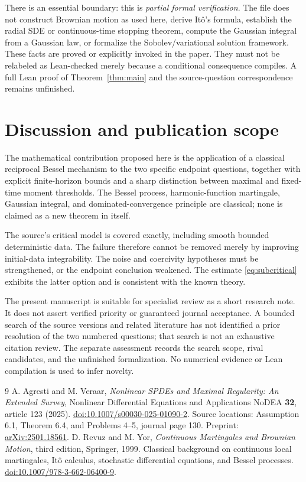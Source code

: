 \documentclass[11pt]{article}
\theoremstyle{remark}\newtheorem{remark}[theorem]{Remark}
\begin{document}
There is an essential boundary: this is \emph{partial formal verification}. The file does not construct Brownian motion as used here, derive It\^o's formula, establish the radial SDE or continuous-time stopping theorem, compute the Gaussian integral from a Gaussian law, or formalize the Sobolev/variational solution framework. These facts are proved or explicitly invoked in the paper. They must not be relabeled as Lean-checked merely because a conditional consequence compiles. A full Lean proof of Theorem~\ref{thm:main} and the source-question correspondence remains unfinished.

\section{Discussion and publication scope}
The mathematical contribution proposed here is the application of a classical reciprocal Bessel mechanism to the two specific endpoint questions, together with explicit finite-horizon bounds and a sharp distinction between maximal and fixed-time moment thresholds. The Bessel process, harmonic-function martingale, Gaussian integral, and dominated-convergence principle are classical; none is claimed as a new theorem in itself.

The source's critical model is covered exactly, including smooth bounded deterministic data. The failure therefore cannot be removed merely by improving initial-data integrability. The noise and coercivity hypotheses must be strengthened, or the endpoint conclusion weakened. The estimate \eqref{eq:subcritical} exhibits the latter option and is consistent with the known theory.

The present manuscript is suitable for specialist review as a short research note. It does not assert verified priority or guaranteed journal acceptance. A bounded search of the source versions and related literature has not identified a prior resolution of the two numbered questions; that search is not an exhaustive citation review. The separate assessment records the search scope, rival candidates, and the unfinished formalization. No numerical evidence or Lean compilation is used to infer novelty.

\begin{thebibliography}{9}
 A. Agresti and M. Veraar,
\emph{Nonlinear SPDEs and Maximal Regularity: An Extended Survey},
Nonlinear Differential Equations and Applications NoDEA \textbf{32}, article 123 (2025).
\href{https://doi.org/10.1007/s00030-025-01090-2}{doi:10.1007/s00030-025-01090-2}.
Source locations: Assumption 6.1, Theorem 6.4, and Problems 4--5, journal page 130.
Preprint: \href{https://arxiv.org/abs/2501.18561}{arXiv:2501.18561}.
 D. Revuz and M. Yor,
\emph{Continuous Martingales and Brownian Motion}, third edition,
Springer, 1999. Classical background on continuous local martingales,
It\^o calculus, stochastic differential equations, and Bessel processes.
\href{https://doi.org/10.1007/978-3-662-06400-9}{doi:10.1007/978-3-662-06400-9}.
\end{thebibliography}
\end{document}
